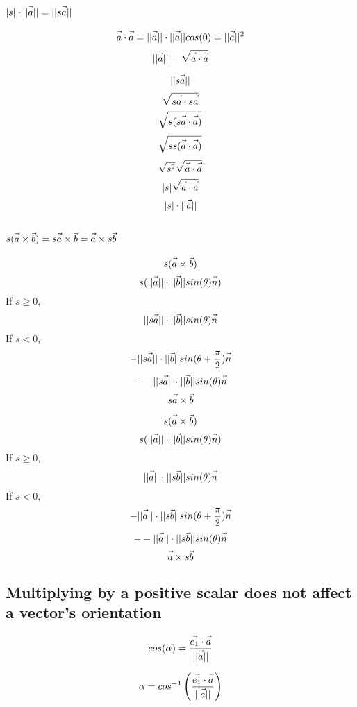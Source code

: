 \documentclass{article}
\newcommand{\fvec}[1]{\vec{\vphantom{A}#1}}
\begin{document}
\subsection{$ |s| \cdot ||\fvec{a}|| = ||s\fvec{a}|| $}
$$ \fvec{a} \cdot \fvec{a} = ||\fvec{a}|| \cdot ||\fvec{a}|| cos(0) = ||\fvec{a}||^2 $$
$$ ||\fvec{a}|| = \sqrt{\fvec{a} \cdot \fvec{a}} $$

$$ ||s\fvec{a}|| $$
$$ \sqrt{s\fvec{a} \cdot s\fvec{a}} $$
$$ \sqrt{s(s\fvec{a} \cdot \fvec{a})} $$
$$ \sqrt{ss(\fvec{a} \cdot \fvec{a})} $$
$$ \sqrt{s^2}\sqrt{\fvec{a} \cdot \fvec{a}} $$
$$ |s|\sqrt{\fvec{a} \cdot \fvec{a}} $$
$$ |s| \cdot ||\fvec{a}|| $$

\subsection{$ s(\fvec{a} \times \fvec{b}) = s\fvec{a} \times \fvec{b} = \fvec{a} \times s\fvec{b} $}
\noindent\begin{minipage}{.5\linewidth}
    $$ s(\fvec{a} \times \fvec{b}) $$
    $$ s(||\fvec{a}|| \cdot ||\fvec{b}|| sin(\theta) \fvec{n}) $$
    If $ s \ge 0 $, 
    $$ ||s\fvec{a}|| \cdot ||\fvec{b}|| sin(\theta) \fvec{n} $$
    If $ s < 0 $, 
    $$ -||s\fvec{a}|| \cdot ||\fvec{b}|| sin(\theta + \frac{\pi}{2}) \fvec{n} $$
    $$ --||s\fvec{a}|| \cdot ||\fvec{b}|| sin(\theta) \fvec{n} $$
    $$ s\fvec{a} \times \fvec{b} $$
\end{minipage}%
\hfill
\begin{minipage}{.5\linewidth}
    $$ s(\fvec{a} \times \fvec{b}) $$
    $$ s(||\fvec{a}|| \cdot ||\fvec{b}|| sin(\theta) \fvec{n}) $$
    If $ s \ge 0 $, 
    $$ ||\fvec{a}|| \cdot ||s\fvec{b}|| sin(\theta) \fvec{n} $$
    If $ s < 0 $, 
    $$ -||\fvec{a}|| \cdot ||s\fvec{b}|| sin(\theta + \frac{\pi}{2}) \fvec{n} $$
    $$ --||\fvec{a}|| \cdot ||s\fvec{b}|| sin(\theta) \fvec{n} $$
    $$ \fvec{a} \times s\fvec{b} $$
\end{minipage}%

\subsection{Multiplying by a positive scalar does not affect a vector's orientation}
\noindent\begin{minipage}{.5\linewidth}
    $$ cos(\alpha) = \frac{\fvec{e_1} \cdot \fvec{a}}{||\fvec{a}||} $$
    \end{minipage}%
    \hfill
    \begin{minipage}{.5\linewidth}
    $$ \alpha = cos^{-1}\left(\frac{\fvec{e_1} \cdot \fvec{a}}{||\fvec{a}||}\right) $$
\end{minipage}%
\end{document}
